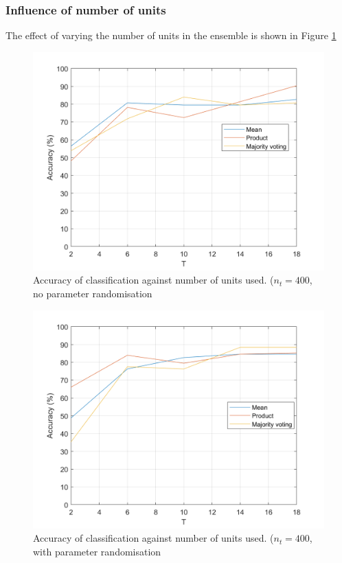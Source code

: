 \documentclass[10pt,technote]{IEEEtran}
\begin{document}
\subsubsection{Influence of number of units}
The effect of varying the number of units in the ensemble is shown in Figure \ref{fig:acc_vs_n_units}

\begin{figure}

    \centering
    \includegraphics[width=\linewidth]{../results/ex2LDAEnsemble/acc_vs_n_unit.png}
    \caption{Accuracy of classification against number of units used. ($n_t = 400$, no parameter randomisation }
    \label{fig:acc_vs_n_units}
\end{figure}
\begin{figure}

    \centering
    \includegraphics[width=\linewidth]{../results/ex2LDAEnsemble/acc_vs_n_unit_rand.png}
    \caption{Accuracy of classification against number of units used. ($n_t = 400$, with parameter randomisation }
    \label{fig:acc_vs_n_units_rand}
\end{figure}
\end{document}
